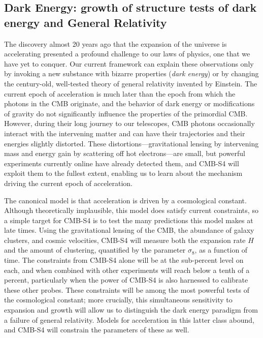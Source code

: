 \subsection*{Dark Energy: growth of structure tests of dark energy and General Relativity}

The discovery almost 20 years ago that the expansion of the universe is accelerating presented a profound challenge to our laws of physics, one that we have yet to conquer. Our current framework can explain these observations only by invoking a new substance with bizarre properties ({\it dark energy}) or by changing the century-old, well-tested theory of general relativity invented by Einstein. The current epoch of acceleration is much later than the epoch from which the photons in the CMB originate, and the behavior of dark energy or modifications of gravity do not significantly influence the properties of the primordial CMB. However, during their long journey to our telescopes, CMB photons occasionally interact with the intervening matter and can have their trajectories and their energies slightly distorted. These distortions---gravitational lensing by intervening mass and energy gain by scattering off hot electrons---are small, but powerful experiments currently online have already detected them, and CMB-S4 will exploit them to the fullest extent, enabling us to learn about the mechanism driving the current epoch of acceleration.

The canonical model is that acceleration is driven by a cosmological constant. Although theoretically implausible, this model does satisfy current constraints, so a simple target for CMB-S4 is to test the many predictions this model makes at late times. Using the gravitational lensing of the CMB, the abundance of galaxy clusters, and cosmic velocities, CMB-S4 will measure both the expansion rate $H$ and the amount of clustering, quantified by the parameter $\sigma_8$, as a function of time. The constraints from CMB-S4 alone will be at the sub-percent level on each, and when combined with other experiments will reach below a tenth of a percent, particularly when the power of CMB-S4 is also harnessed to calibrate these other probes. These constraints will be among the most powerful tests of the cosmological constant; more crucially, this simultaneous sensitivity to expansion and growth will allow us to distinguish the dark energy paradigm from a failure of general relativity. Models for acceleration in this latter class abound, and CMB-S4 will constrain the parameters of these as well. 


